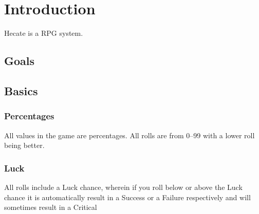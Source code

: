 
\chapter{Introduction}
Hecate is a \gls{RPG} system.

\section{Goals}
\section{Basics}
\subsection{Percentages}
All values in the game are percentages. All rolls are from 0--99 with a lower roll being better.
\subsection{Luck}
All rolls include a \gls{Luck} chance, wherein if you roll below or above the \gls{Luck} chance it is automatically result in a \gls{Success} or a \gls{Failure} respectively and will sometimes result in a \gls{Critical}
